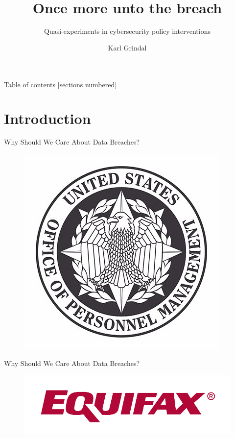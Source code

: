 \documentclass[10pt]{beamer}
\title{Once more unto the breach}
\subtitle{Quasi-experiments in cybersecurity policy interventions}
\date{}
\author{Karl Grindal}
\institute{Georgia Institute of Technology}
\begin{document}
\maketitle

\begin{frame}{Table of contents}
  [sections numbered]
  \tableofcontents%
\end{frame}

\section[Intro]{Introduction}

\begin{frame}{Why Should We Care About Data Breaches?}
  \begin{figure}
	\includegraphics[width=\textwidth,height=\textheight,keepaspectratio]{Figures/OPM.jpg}
    \end{figure}
\end{frame}

\begin{frame}{Why Should We Care About Data Breaches?}
  \begin{figure}
	\includegraphics[width=\textwidth,height=\textheight,keepaspectratio]{Figures/Equifax-Logo.jpg}
    \end{figure}
\end{frame}
\end{document}
